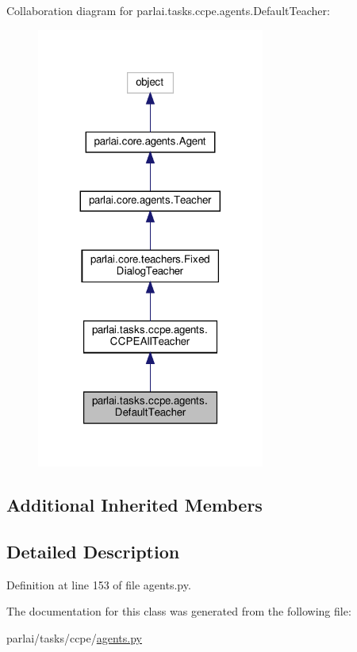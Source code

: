 Collaboration diagram for parlai.\+tasks.\+ccpe.\+agents.\+Default\+Teacher\+:
\nopagebreak
\begin{figure}[H]
\begin{center}
\leavevmode
\includegraphics[width=212pt]{classparlai_1_1tasks_1_1ccpe_1_1agents_1_1DefaultTeacher__coll__graph}
\end{center}
\end{figure}
\subsection*{Additional Inherited Members}


\subsection{Detailed Description}


Definition at line 153 of file agents.\+py.



The documentation for this class was generated from the following file\+:\begin{DoxyCompactItemize}
\item 
parlai/tasks/ccpe/\hyperlink{parlai_2tasks_2ccpe_2agents_8py}{agents.\+py}\end{DoxyCompactItemize}
